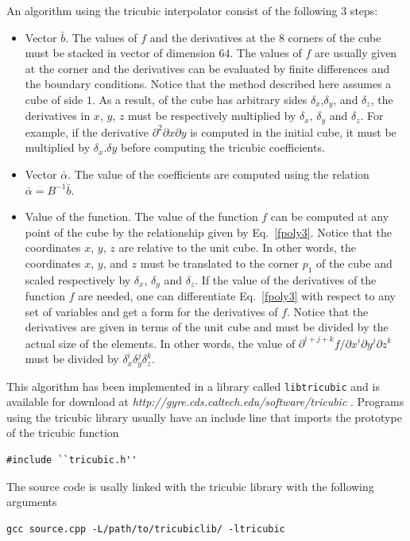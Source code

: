 \documentclass{article}
\begin{document}
An algorithm using the tricubic interpolator consist of the following 3 steps:
\begin{itemize}
\item Vector $\bar{b}$. The values of $f$ and the derivatives at the 8 corners of the cube must be stacked in vector of dimension $64$. The values of $f$ are usually given at the corner and the derivatives can be evaluated by finite differences and the boundary conditions. Notice that the method described here assumes a cube of side $1$. As a result, of the cube has arbitrary sides $\delta _x$,$\delta _y$, and $\delta _z$, the derivatives in $x$, $y$, $z$ must be respectively multiplied by $\delta _x$, $\delta _y$ and $\delta _z$. For example, if the derivative $\partial ^2 \partial x \partial y$ is computed in the initial cube, it must be multiplied by $\delta _x . \delta y$ before computing the tricubic coefficients.
\item Vector $\bar{\alpha }$. The value of the coefficients are computed using the relation $\bar{\alpha } = B^{-1} \bar{b}$.
\item Value of the function. The value of the function $f$ can be computed at any point of the cube by the relationship given by Eq.~\ref{fpoly3}. Notice that the coordinates $x$, $y$, $z$ are relative to the unit cube. In other words, the coordinates $x$, $y$, and $z$ must be translated to the corner $p_1$ of the cube and scaled respectively by $\delta _x$, $\delta _y$ and $\delta _z$. If the value of the derivatives of the function $f$ are needed, one can differentiate Eq.~\ref{fpoly3} with respect to any set of variables and get a form for the derivatives of $f$. Notice that the derivatives are given in terms of the unit cube and must be divided by the actual size of the elements. In other words, the value of $\partial ^{i+j+k} f / \partial x^i \partial y^j \partial z^k$ must be divided by $\delta _x^i \delta _y^j \delta _z^k$.
\end{itemize}

\noindent This algorithm has been implemented in a library called \verb+libtricubic+ and is available for download at {\em http://gyre.cds.caltech.edu/software/tricubic }. Programs using the tricubic library usually have an include line that imports the prototype of the tricubic function
\begin{verbatim}
#include ``tricubic.h''
\end{verbatim}
The source code is usally linked with the tricubic library with the following arguments
\begin{verbatim}
gcc source.cpp -L/path/to/tricubiclib/ -ltricubic
\end{verbatim}
\end{document}
